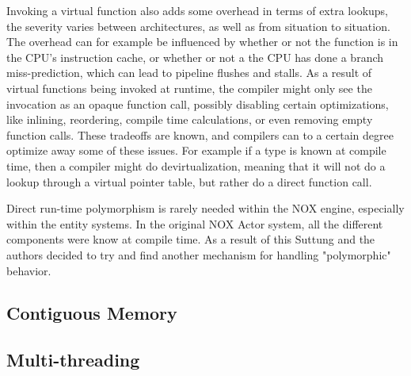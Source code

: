 Invoking a virtual function also adds some overhead in terms of extra lookups, the severity varies between architectures,
as well as from situation to situation.
The overhead can for example be influenced by whether or not the function is in the CPU's instruction cache,
or whether or not a the CPU has done a branch miss-prediction, which can lead to pipeline flushes and stalls. \cite{scott_meyers_cpu_caches_and_why_you_care} \cite[Data Locality]{game_programming_patterns}
As a result of virtual functions being invoked at runtime, the compiler might only see the invocation as an opaque function call,
possibly disabling certain optimizations, like inlining, reordering, compile time calculations, or even removing empty function calls.
These tradeoffs are known, and compilers can to a certain degree optimize away some of these issues.
For example if a type is known at compile time, then a compiler might do devirtualization,
meaning that it will not do a lookup through a virtual pointer table, but rather do a direct function call. \cite{lazarenko_devirtualization}

Direct run-time polymorphism is rarely needed within the NOX engine, especially within the entity systems.
In the original NOX Actor system, all the different components were know at compile time.
As a result of this Suttung and the authors decided to try and find another mechanism for handling "polymorphic" behavior.

\subsection{Contiguous Memory}

\subsection{Multi-threading}
